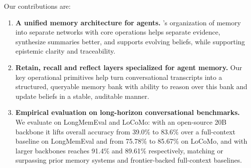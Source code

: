Our contributions are:
\begin{enumerate}[itemsep=-0.1em]

    \item \textbf{A unified memory architecture for agents.} \our's organization of memory into separate networks with core operations helps separate evidence, synthesize summaries better, and supports evolving beliefs, while supporting epistemic clarity and traceability.

    \item \textbf{Retain, recall and reflect layers specialized for agent memory.} Our key operational primitives help turn conversational transcripts into a structured, queryable memory bank with ability to reason over this bank and update beliefs in a stable, auditable manner.
    
    \item \textbf{Empirical evaluation on long-horizon conversational benchmarks.} We evaluate \our on LongMemEval and LoCoMo: with an open-source 20B backbone it lifts overall accuracy from 39.0\% to 83.6\% over a full-context baseline on LongMemEval and from 75.78\% to 85.67\% on LoCoMo, and with larger backbones reaches 91.4\% and 89.61\% respectively, matching or surpassing prior memory systems and frontier-backed full-context baselines.

\end{enumerate}
